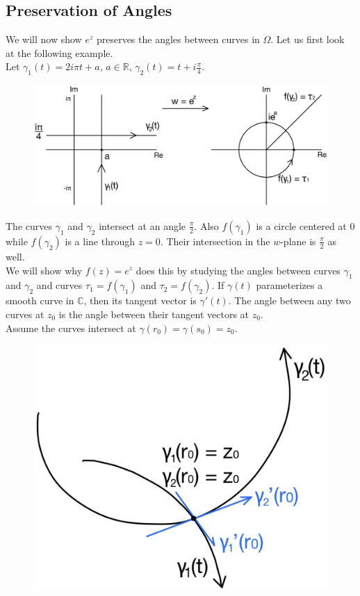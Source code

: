 \documentclass[11pt]{article}
\begin{document}
\subsection{Preservation of Angles}
We will now show $e^z$ preserves the angles between curves in $\Omega$. Let us first look at the following example. \\ 
Let $\gamma_1(t) = 2i\pi t + a$, $a \in \mathbb{R}$, $\gamma_2(t) = t + i\frac{\pi}{4}$. 
\begin{figure}[H]
\includegraphics[scale = 0.2]{9_3}
\centering
\end{figure}
The curves $\gamma_1$ and $\gamma_2$ intersect at an angle $\frac{\pi}{2}$. Also $f(\gamma_1)$ is a circle centered at 0 while $f(\gamma_2)$ is a line through $z = 0$. Their intersection in the $w$-plane is $\frac{\pi}{2}$ as well. \\
We will show why $f(z) = e^z$ does this by studying the angles between curves $\gamma_1$ and $\gamma_2$ and curves $\tau_1 = f(\gamma_1)$ and $\tau_2 = f(\gamma_2)$. 
If $\gamma(t)$ parameterizes a smooth curve in $\mathbb{C}$, then its tangent vector is $\gamma'(t)$. The angle between any two curves at $z_0$ is the angle between their tangent vectors at $z_0$. \\
Assume the curves intersect at $\gamma(r_0) = \gamma(s_0) = z_0$. 
\begin{figure}[H]
\includegraphics[scale = 0.2]{9_4}
\centering
\end{figure}
\end{document}
